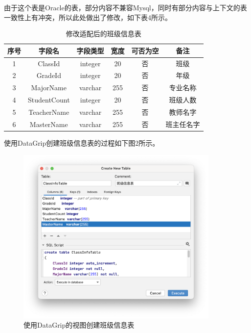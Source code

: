 \documentclass[a4paper,UTF8,heading=false,12pt]{article}
\begin{document}
    由于这个表是Oracle的表，部分内容不兼容Mysql，同时有部分内容与上下文的表一致性上有冲突，所以此处做出了修改，如下表4所示。

    \begin{table}[htbp]
        \begin{center}
            \begin{tabular}{@{}cccccc@{}}
                \toprule
                序号 & 字段名         & 字段类型    & 宽度  & 可否为空 & 备注   \\ \midrule
                1  & ClassId   & integer & 20  & 否    & 班级   \\
                2  & GradeId & integer & 20 & 否    & 年级   \\
                3  & MajorName     & varchar & 255  & 否    & 专业名称   \\
                4  & StudentCount & integer & 20  & 否    & 班级人数   \\
                5  & TeacherName  & varchar & 255 & 否    & 教师名字 \\
                6  & MasterName & varchar & 255  & 否   & 班主任名字   \\ \bottomrule
                \end{tabular}
                \caption{修改适配后的班级信息表}
        \end{center}
    \end{table}

    使用DataGrip创建班级信息表的过程如下图2所示。

    \begin{figure}[htbp]
        \centering
        \includegraphics[width=10cm]{../Images/ClassInfoTable.png}
        \caption{使用DataGrip的视图创建班级信息表}
    \end{figure}
\end{document}
